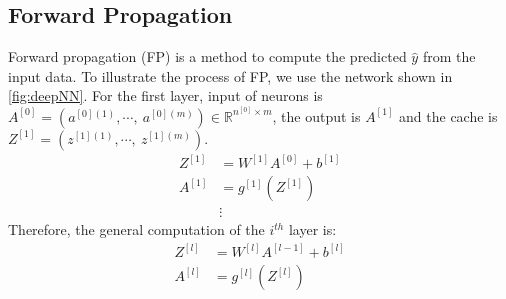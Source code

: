 \subsection{Forward Propagation}
Forward propagation (FP) is a method to compute the predicted $ \hat{y} $
from the input data. To illustrate the process of FP, we use the network
shown in \autoref{fig:deepNN}. For the first layer, input of neurons is
$ A^{[0]} = (a^{[0](1)},\cdots,\ a^{[0](m)}) \in \mathbb{R}^{n^{[0]}\times m} $,
the output is $ A^{[1]} $ and the cache is $ Z^{[1]} = (z^{[1](1)},\cdots,\ z^{[1](m)}) $. 
\begin{equation}
    \begin{split}
        Z^{[1]} & = W^{[1]}A^{[0]} + b^{[1]} \\
        A^{[1]} & = g^{[1]}(Z^{[1]}) \\
        & \vdots
    \end{split}
\end{equation} 
Therefore, the general computation of the $ i^{th} $ layer is:
\begin{equation}
    \label{equ:FP}
    \begin{split}
        Z^{[l]} & = W^{[l]}A^{[l-1]} + b^{[l]} \\
        A^{[l]} & = g^{[l]}(Z^{[l]})
    \end{split}
\end{equation} 

